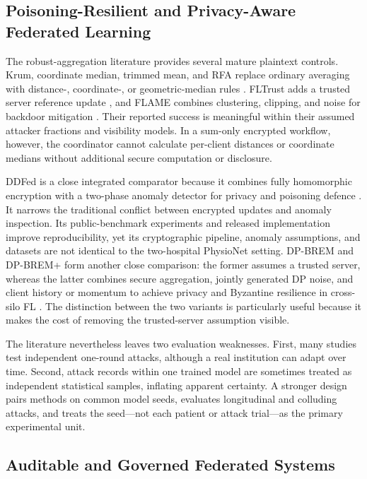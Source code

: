 \subsection{Poisoning-Resilient and Privacy-Aware Federated Learning}

The robust-aggregation literature provides several mature plaintext controls. Krum, coordinate median, trimmed mean, and RFA replace ordinary averaging with distance-, coordinate-, or geometric-median rules \cite{blanchard2017krum,yin2018byzantine,pillutla2022robust}. FLTrust adds a trusted server reference update \cite{cao2021fltrust}, and FLAME combines clustering, clipping, and noise for backdoor mitigation \cite{nguyen2022flame}. Their reported success is meaningful within their assumed attacker fractions and visibility models. In a sum-only encrypted workflow, however, the coordinator cannot calculate per-client distances or coordinate medians without additional secure computation or disclosure.

DDFed is a close integrated comparator because it combines fully homomorphic encryption with a two-phase anomaly detector for privacy and poisoning defence \cite{xu2024ddfed}. It narrows the traditional conflict between encrypted updates and anomaly inspection. Its public-benchmark experiments and released implementation improve reproducibility, yet its cryptographic pipeline, anomaly assumptions, and datasets are not identical to the two-hospital PhysioNet setting. DP-BREM and DP-BREM+ form another close comparison: the former assumes a trusted server, whereas the latter combines secure aggregation, jointly generated DP noise, and client history or momentum to achieve privacy and Byzantine resilience in cross-silo FL \cite{gu2025dpbrem}. The distinction between the two variants is particularly useful because it makes the cost of removing the trusted-server assumption visible.

The literature nevertheless leaves two evaluation weaknesses. First, many studies test independent one-round attacks, although a real institution can adapt over time. Second, attack records within one trained model are sometimes treated as independent statistical samples, inflating apparent certainty. A stronger design pairs methods on common model seeds, evaluates longitudinal and colluding attacks, and treats the seed---not each patient or attack trial---as the primary experimental unit.

\subsection{Auditable and Governed Federated Systems}

